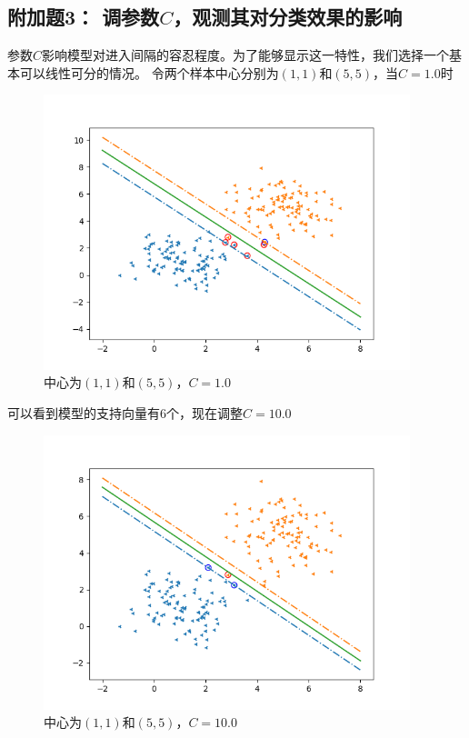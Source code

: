 \documentclass{article}
\begin{document}
\subsection*{\Large 附加题3： \textbf{调参数$C$，观测其对分类效果的影响
}}
参数$C$影响模型对进入间隔的容忍程度。为了能够显示这一特性，我们选择一个基本可以线性可分的情况。
令两个样本中心分别为$(1,1)$和$(5,5)$，当$C=1.0$时
\begin{figure}[H]
    \centering
    \begin{minipage}[t]{1.0\linewidth}
        \centering
        \includegraphics[height=8cm]{1c.png}
        \caption{中心为$(1,1)$和$(5,5)$，$C=1.0$}
\end{minipage}
\end{figure}
可以看到模型的支持向量有$6$个，现在调整$C=10.0$
\begin{figure}[H]
    \centering
    \begin{minipage}[t]{1.0\linewidth}
        \centering
        \includegraphics[height=8cm]{10c.png}
        \caption{中心为$(1,1)$和$(5,5)$，$C=10.0$}
\end{minipage}
\end{figure}
\end{document}
